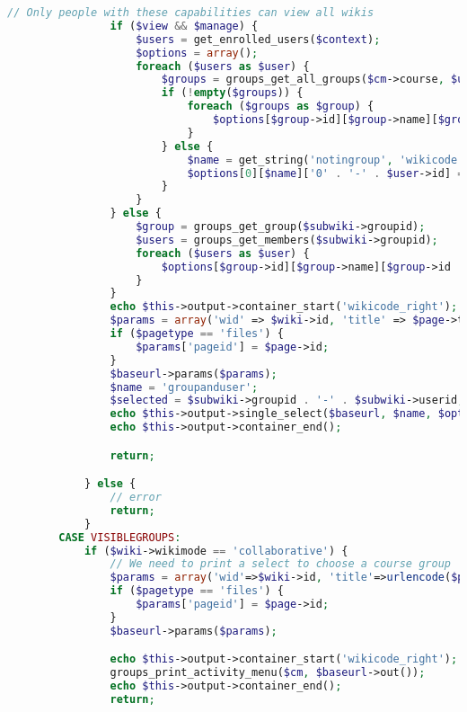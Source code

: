 \begin{lstlisting}[language=PHP]
                // Only people with these capabilities can view all wikis
                if ($view && $manage) {
                    $users = get_enrolled_users($context);
                    $options = array();
                    foreach ($users as $user) {
                        $groups = groups_get_all_groups($cm->course, $user->id);
                        if (!empty($groups)) {
                            foreach ($groups as $group) {
                                $options[$group->id][$group->name][$group->id . '-' . $user->id] = fullname($user);
                            }
                        } else {
                            $name = get_string('notingroup', 'wikicode');
                            $options[0][$name]['0' . '-' . $user->id] = fullname($user);
                        }
                    }
                } else {
                    $group = groups_get_group($subwiki->groupid);
                    $users = groups_get_members($subwiki->groupid);
                    foreach ($users as $user) {
                        $options[$group->id][$group->name][$group->id . '-' . $user->id] = fullname($user);
                    }
                }
                echo $this->output->container_start('wikicode_right');
                $params = array('wid' => $wiki->id, 'title' => $page->title);
                if ($pagetype == 'files') {
                    $params['pageid'] = $page->id;
                }
                $baseurl->params($params);
                $name = 'groupanduser';
                $selected = $subwiki->groupid . '-' . $subwiki->userid;
                echo $this->output->single_select($baseurl, $name, $options, $selected);
                echo $this->output->container_end();

                return;

            } else {
                // error
                return;
            }
        CASE VISIBLEGROUPS:
            if ($wiki->wikimode == 'collaborative') {
                // We need to print a select to choose a course group
                $params = array('wid'=>$wiki->id, 'title'=>urlencode($page->title));
                if ($pagetype == 'files') {
                    $params['pageid'] = $page->id;
                }
                $baseurl->params($params);

                echo $this->output->container_start('wikicode_right');
                groups_print_activity_menu($cm, $baseurl->out());
                echo $this->output->container_end();
                return;


\end{lstlisting}
